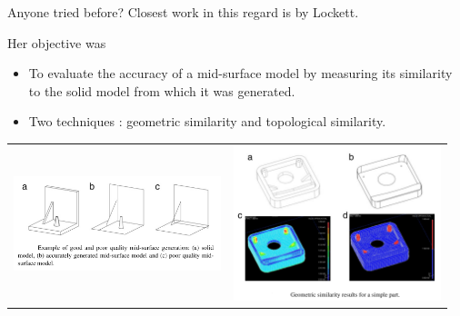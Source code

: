\begin{frame}{Anyone tried before?}
Closest work in this regard is by Lockett\cite{Lockett2008}. 

Her objective was
\begin{itemize}[noitemsep,label=\textbullet,topsep=2pt,parsep=2pt,partopsep=2pt]
\item To evaluate the accuracy of a mid-surface model by measuring its similarity to the solid model from which it was generated. 
\item Two techniques : geometric similarity and topological similarity.
\end{itemize}
\begin{tabular}[h]{@{}p{0.48\linewidth} p{0.48\linewidth}@{}} 
\includegraphics[width=\linewidth]{../Common/images/GoodBadMidsurf}
&
\includegraphics[width=\linewidth]{../Common/images/GeometricSimilarity}\\
\end{tabular}
\end{frame}

